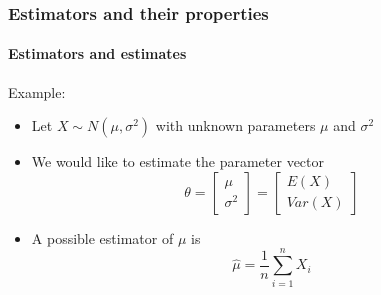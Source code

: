 \documentclass[notes=show]{beamer}
\begin{document}
\begin{frame}\frametitle{Estimators and their properties}\framesubtitle{Estimators and estimates}
Example:
\begin{itemize}
    \item Let $X\sim N(\mu ,\sigma ^{2})$ with unknown parameters $\mu $ and $\sigma ^{2}$
    \item We would like to estimate the parameter vector
        \begin{equation*}
            \theta =\left[
            \begin{array}{c}
            \mu \\
            \sigma ^{2}
            \end{array}
            \right] =\left[
            \begin{array}{c}
            E(X) \\
            Var(X)
            \end{array}
            \right]
        \end{equation*}
    \item A possible estimator of $\mu $ is
        \begin{equation*}
            \hat{\mu}=\frac{1}{n}\sum_{i=1}^{n}X_{i}
        \end{equation*}
\end{itemize}
\end{frame}
\end{document}
